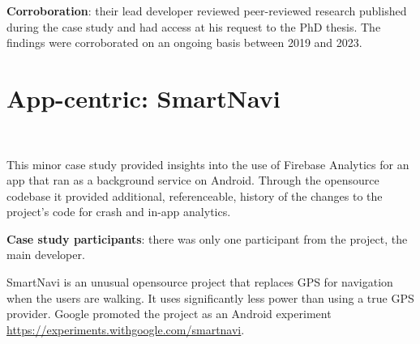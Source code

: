     


\textbf{Corroboration}: their lead developer reviewed peer-reviewed research published during the case study and had access at his request to the PhD thesis. The findings were corroborated on an ongoing basis between 2019 and 2023.






\section{App-centric: SmartNavi}~\label{case-study-overview-smartnavi}

This minor case study provided insights into the use of Firebase Analytics for an app that ran as a background service on Android. Through the opensource codebase it provided additional, referenceable, history of the changes to the project's code for crash and in-app analytics.

\textbf{Case study participants}: there was only one participant from the project, the main developer.

SmartNavi is an unusual opensource project that replaces GPS for navigation when the users are walking. It uses significantly less power than using a true GPS provider. Google promoted the project as an Android experiment \url{https://experiments.withgoogle.com/smartnavi}.

